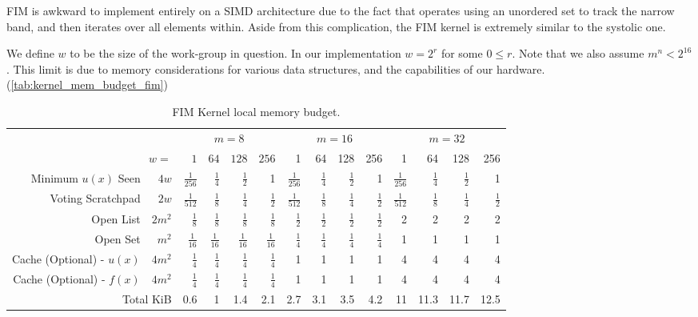 \documentclass[11pt]{article}       %
\begin{document}
FIM is awkward to implement entirely on a SIMD architecture due to the fact that operates using an unordered set to track the narrow band, and then iterates over all elements within. Aside from this complication, the FIM kernel is extremely similar to the systolic one.

We define $w$ to be the size of the work-group in question. In our implementation $w = 2^r$ for some $0 \le r$. Note that we also assume $m^n < 2^16$. This limit is due to memory considerations for various data structures, and the capabilities of our hardware. (\autoref{tab:kernel_mem_budget_fim})

\begin{table}
\centering
\begin{tabular}{|r r|r|r|r|r|r|r|r|r|r|r|r|r|}
\cline{3-14}
\multicolumn{2}{c|}{} & \multicolumn{4}{c|}{$m=8$}                       & \multicolumn{4}{c|}{$m=16$}       & \multicolumn{4}{c|}{$m=32$}     \\ \cline{3-14} 
\multicolumn{2}{r|}{$w=$} 			& $1$       		& $64$   & $128$    & $256$    & 1           & 64    & 128  & 256  & 1           & 64    & 128 & 256 \\ \hline
Minimum $u(x)$ Seen       & $4w$	&$\frac{1}{256}$	&$\frac{1}{4}$	&$\frac{1}{2}$	&1	&$\frac{1}{256}$	&$\frac{1}{4}$	&$\frac{1}{2}$	&1	&$\frac{1}{256}$	&$\frac{1}{4}$	&$\frac{1}{2}$	&1\\ \hline
Voting Scratchpad         & $2w$	&$\frac{1}{512}$	&$\frac{1}{8}$	&$\frac{1}{4}$	&$\frac{1}{2}$	&$\frac{1}{512}$	&$\frac{1}{8}$	&$\frac{1}{4}$	&$\frac{1}{2}$	&$\frac{1}{512}$	&$\frac{1}{8}$	&$\frac{1}{4}$	&$\frac{1}{2}$\\ \hline
Open List                 & $2m^2$	&$\frac{1}{8}$	&$\frac{1}{8}$	&$\frac{1}{8}$	&$\frac{1}{8}$	&$\frac{1}{2}$	&$\frac{1}{2}$	&$\frac{1}{2}$	&$\frac{1}{2}$	&2	&2	&2	&2\\ \hline
Open Set                  & $m^2$	&$\frac{1}{16}$	&$\frac{1}{16}$	&$\frac{1}{16}$	&$\frac{1}{16}$	&$\frac{1}{4}$	&$\frac{1}{4}$	&$\frac{1}{4}$	&$\frac{1}{4}$	&1	&1	&1	&1\\ \hline
Cache (Optional) - $u(x)$ & $4m^2$	&$\frac{1}{4}$	&$\frac{1}{4}$	&$\frac{1}{4}$	&$\frac{1}{4}$	&1	&1	&1	&1	&4	&4	&4	&4\\ \hline
Cache (Optional) - $f(x)$ & $4m^2$	&$\frac{1}{4}$	&$\frac{1}{4}$	&$\frac{1}{4}$	&$\frac{1}{4}$	&1	&1	&1	&1	&4	&4	&4	&4\\ \hline
\multicolumn{2}{|r|}{Total KiB}	&0.6	&1	&1.4	&2.1	&2.7	&3.1	&3.5	&4.2	&11	&11.3	&11.7	&12.5\\ \hline
\end{tabular}
\caption{FIM Kernel local memory budget.}
\label{tab:kernel_mem_budget_fim}
\end{table}
\end{document}
